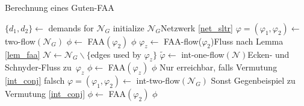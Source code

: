 \begin{algorithm}
\caption{Berechnung eines Guten-FAA}
\label{algo_gfaa}
\begin{algorithmic}[1]
	\State $\{d_1,d_2\} \gets $ demands for $\mathcal{N}_G$
	\State initialize $\mathcal{N}_G$\Comment Netzwerk \ref{net_sltr}
	\State $\varphi=(\varphi_1,\varphi_2) \gets $ two-flow$(\mathcal{N}_G)$
			\State $\phi \gets $ FAA$(\varphi_2)$
			\State \Return $\phi$
		\Else
			\State $\varphi_z \gets$ FAA-flow($\varphi_2$)\Comment Fluss nach Lemma \ref{lem_faa}
			\State $\mathcal{N} \gets \mathcal{N}_G \backslash \{$edges used by $\varphi_z\}$\label{algo_check}
			\State $\tilde{\varphi} \gets $ int-one-flow$(\mathcal{N})$\Comment Ecken- und Schnyder-Fluss zu $\varphi_z$
				\State $\phi \gets $ FAA$(\varphi_z)$
				\State \Return $\phi$
			\Else \Comment Nur erreichbar, falls Vermutung \ref{int_conj} falsch
				\State $\varphi=(\varphi_1,\varphi_2) \gets $ int-two-flow$(\mathcal{N}_G)$
				\Comment Sonst Gegenbeispiel zu Vermutung \ref{int_conj}
					\State $\phi \gets $ FAA$(\varphi_2)$
					\State \Return $\phi$
				\EndIf
			\EndIf
		\EndIf
	\EndIf
\EndIf
\EndProcedure
\end{algorithmic}
\end{algorithm}
